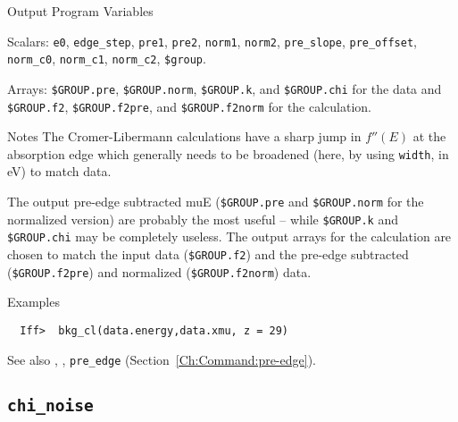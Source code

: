 \begin{IFFcom}
\item[Output Program Variables] 

  \begin{sloppypar}
    Scalars:    {\tt{e0}}, {\tt{edge\_step}}, {\tt{pre1}}, {\tt{pre2}}, {\tt{norm1}},
    {\tt{norm2}}, {\tt{pre\_slope}}, {\tt{pre\_offset}}, {\tt{norm\_c0}},
    {\tt{norm\_c1}}, {\tt{norm\_c2}}, {\tt{\$group}}.
  \end{sloppypar}
  \begin{sloppypar}
    Arrays:  {\tt{\$GROUP.pre}}, {\tt{\$GROUP.norm}}, {\tt{\$GROUP.k}}, and
    {\tt{\$GROUP.chi}} for the data and 
    {\tt{\$GROUP.f2}}, {\tt{\$GROUP.f2pre}},  and   {\tt{\$GROUP.f2norm}}
    for the calculation.
  \end{sloppypar}
  
\item[Notes] The Cromer-Libermann calculations have a sharp jump in $f''(E)$
  at the absorption edge which generally needs to be broadened (here, by using
  {\tt{width}}, in eV) to match {\muE} data.  
  
  The output pre-edge subtracted {muE} ({\tt{\$GROUP.pre}} and
  {\tt{\$GROUP.norm}} for the normalized version) are probably the most
  useful -- while {\tt{\$GROUP.k}} and {\tt{\$GROUP.chi}} may be completely
  useless.  The output arrays for the calculation are chosen to match the
  input {\muE} data ({\tt{\$GROUP.f2}}) and the pre-edge subtracted
  ({\tt{\$GROUP.f2pre}}) and normalized ({\tt{\$GROUP.f2norm}}) data.
  

\item[Examples] {\hspace{0.25truein} \vspace{-0.1truein} \relax }
\begin{verbatim} 
  Iff>  bkg_cl(data.energy,data.xmu, z = 29)
\end{verbatim}
\item[See also] {},  {}, 
  {\texttt{pre\_edge}} (Section~\ref{Ch:Command:pre-edge}).
\end{IFFcom}

\relax\par\vfill
\subsection{\texttt{chi\_noise}}
    \label{Ch:Command:chi-noise}

